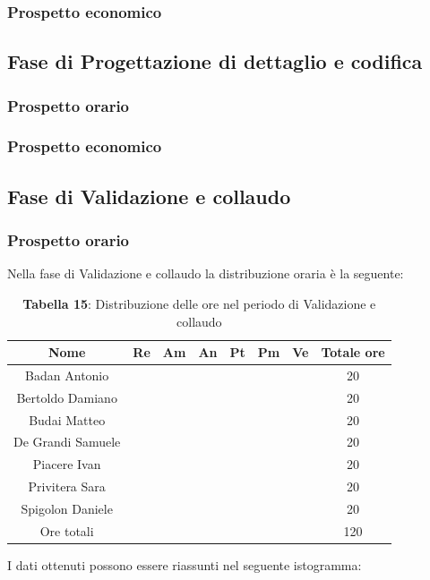 \subsubsection{Prospetto economico}

\subsection{Fase di Progettazione di dettaglio e codifica}
\subsubsection{Prospetto orario}

\subsubsection{Prospetto economico}

\subsection{Fase di Validazione e collaudo}
\subsubsection{Prospetto orario}
Nella fase di Validazione e collaudo la distribuzione oraria è la seguente:

\begin{table}[H]
	\centering
	\renewcommand{\arraystretch}{1.5}
	\begin{tabular}{|c|c|c|c|c|c|c|c|}
		\hline
		\rowcolor{lighter-grayer}
		Nome & Re & Am & An & Pt & Pm & Ve & Totale ore\\
		\hline
		Badan Antonio &  &  &  &  &  &  & 20 \\
		\hline
		Bertoldo Damiano&  &  &  &  &  &  & 20 \\
		\hline
		Budai Matteo&  &  &  &  &  &  & 20 \\
		\hline
		De Grandi Samuele&  &  &  &  &  &  & 20 \\
		\hline
		Piacere Ivan&  &  &  &  &  &  & 20 \\
		\hline
		Privitera Sara&  &  &  &  &  &  & 20 \\
		\hline
		Spigolon Daniele&  &  &  &  &  &  & 20 \\
		\hline
		Ore totali&  &  &  &  &  &  & 120 \\
		\hline
	\end{tabular}
	\caption*{\textbf{Tabella 15}: Distribuzione delle ore nel periodo di Validazione e collaudo\\}
\end{table}	
	I dati ottenuti possono essere riassunti nel seguente istogramma:

